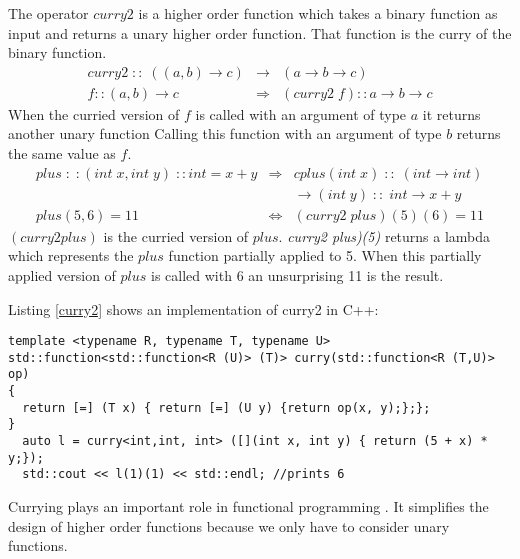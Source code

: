 \documentclass[12pt,fleqn]{article}
\begin{document}
The operator $curry2$ is a higher order function which takes a binary function as input 
and returns a unary higher order function.
That function is the curry of the binary function.
\begin{eqnarray*}
curry2 \; :: \; ((a,b) \rightarrow c) &\rightarrow& (a \rightarrow b \rightarrow c) \\
f::(a,b) \rightarrow c &\Rightarrow&  (curry2\;f)::a \rightarrow b \rightarrow c 
\end{eqnarray*}
When the curried version of $f$ is called with an argument of type $a$ it returns another unary function 
Calling this function with an argument of type $b$ returns the same value as $f$.
\begin{eqnarray*}
plus\;:\;:(int \;x, int \;y) \;::int = x+y &\Rightarrow& cplus(int\; x) \;::\; (int \rightarrow int)  \\
                                                             & & \rightarrow (int \; y) \;::\; int \rightarrow x+y  \\
plus(5,6) = 11 &\Leftrightarrow&(curry2 \; plus)(5)(6) = 11
\end{eqnarray*}
$(curry2 plus)$ is the curried version of $plus$.
{\em curry2 plus)(5)} returns a lambda which represents the $plus$ function partially applied to 5. 
When this partially applied version of $plus$ is called with 6 an unsurprising 11 is the result.

Listing \ref{curry2} shows an implementation of curry2 in C++: 


\begin{minipage}{\linewidth}
\begin{lstlisting}[caption=curry for binary operators, label=curry2]
template <typename R, typename T, typename U>
std::function<std::function<R (U)> (T)> curry(std::function<R (T,U)> op)
{
  return [=] (T x) { return [=] (U y) {return op(x, y);};};
}
  auto l = curry<int,int, int> ([](int x, int y) { return (5 + x) * y;});
  std::cout << l(1)(1) << std::endl; //prints 6
\end{lstlisting}
\end{minipage}

%
%
%


Currying plays an important role in functional programming \cite{field}. 
It simplifies the design of higher order functions because we only have to consider unary functions.

\end{document}
